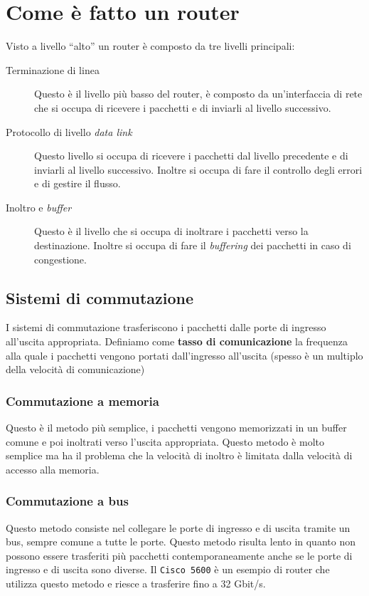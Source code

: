 \section{Come è fatto un router}
    Visto a livello ``alto'' un router è composto da tre livelli principali: \begin{description}
        \item[Terminazione di linea] Questo è il livello più basso del router, è composto da un'interfaccia di rete che si occupa di ricevere i pacchetti e di inviarli al livello successivo.
        \item[Protocollo di livello \textit{data link}] Questo livello si occupa di ricevere i pacchetti dal livello precedente e di inviarli al livello successivo. Inoltre si occupa di fare il controllo degli errori e di gestire il flusso.
        \item[Inoltro e \textit{buffer}] Questo è il livello che si occupa di inoltrare i pacchetti verso la destinazione. Inoltre si occupa di fare il \textit{buffering} dei pacchetti in caso di congestione.
    \end{description}
    \subsection{Sistemi di commutazione}
        I sistemi di commutazione trasferiscono i pacchetti dalle porte di ingresso all'uscita appropriata. Definiamo come \textbf{tasso di comunicazione} la frequenza alla quale i pacchetti vengono portati dall'ingresso all'uscita (spesso è un multiplo della velocità di comunicazione) 
        \subsubsection{Commutazione a memoria}
            Questo è il metodo più semplice, i pacchetti vengono memorizzati in un buffer comune e poi inoltrati verso l'uscita appropriata. Questo metodo è molto semplice ma ha il problema che la velocità di inoltro è limitata dalla velocità di accesso alla memoria.
        \subsubsection{Commutazione a bus}
            Questo metodo consiste nel collegare le porte di ingresso e di uscita tramite un bus, sempre comune a tutte le porte. Questo metodo risulta lento in quanto non possono essere trasferiti più pacchetti contemporaneamente anche se le porte di ingresso e di uscita sono diverse. Il \texttt{Cisco 5600} è un esempio di router che utilizza questo metodo e riesce a trasferire fino a 32 Gbit/s.
